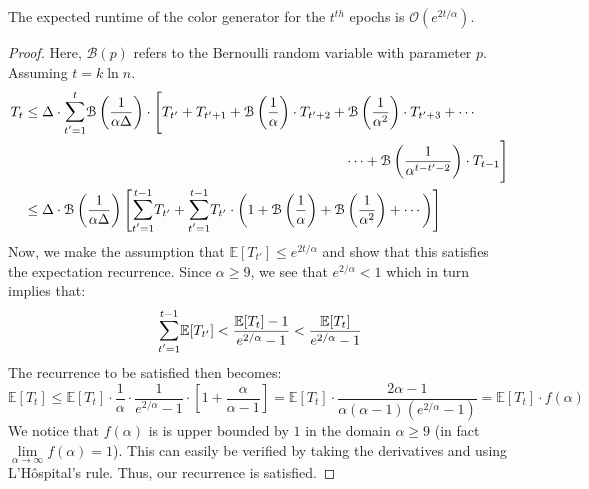 \begin{theorem}
\label{thm:coloring_recurrence}
The expected runtime of the color generator for the $t^{th}$ epochs is $\mathcal O\left( e^{2t/\alpha}\right)$.
\end{theorem}
\begin{proof}
Here, $\mathcal B(p)$ refers to the Bernoulli random variable with parameter $p$.
Assuming $t = k\ln n$.
\begin{align}
T_{t} &\le \Delta \cdot \mathlarger\sum\limits_{t'=1}^{t} \mathcal B\left( \frac{1}{\alpha\Delta}\right)\cdot
\Biggl[ T_{t'} + T_{t'+1} + \mathcal B\left(\frac{1}{\alpha}\right)\cdot T_{t'+2}
+ \mathcal B\left(\frac{1}{\alpha^2}\right)\cdot T_{t'+3} + \cdots\\
&\hspace{23em}
\cdots + \mathcal B\left(\frac{1}{\alpha^{t-t'-2}}\right)\cdot T_{t-1} \Biggr]\\
&\le \Delta\cdot\mathcal B\left( \frac{1}{\alpha\Delta}\right) \Biggl[
\mathlarger\sum\limits_{t'=1}^{t-1} T_{t'} +
\mathlarger\sum\limits_{t'=1}^{t-1} T_{t'}\cdot \left(1 + \mathcal B\left(\frac1\alpha\right) + \mathcal B\left(\frac1{\alpha^2}\right) + \cdots\right)
\Biggr]
\end{align}
Now, we make the assumption that $\mathbb E[T_{t'}]\le e^{2t/\alpha}$ and show that this satisfies the expectation recurrence.
Since $\alpha\ge 9$, we see that $e^{2/\alpha}<1$ which in turn implies that:
\[
\mathlarger\sum\limits_{t'=1}^{t-1} \mathbb E[T_{t'}] < \frac{\mathbb E[T_t]-1}{e^{2/\alpha}-1} < \frac{\mathbb E[T_t]}{e^{2/\alpha}-1}
\]
The recurrence to be satisfied then becomes:
\[
\mathbb E[T_t]\le \mathbb E[T_t]\cdot \frac 1{\alpha}\cdot \frac{1}{e^{2/\alpha}-1}\cdot \left[ 1+ \frac{\alpha}{\alpha-1} \right]
= \mathbb E[T_t]\cdot \frac{2\alpha-1}{\alpha(\alpha-1)(e^{2/\alpha}-1)} = \mathbb E[T_t]\cdot f(\alpha)
\]
We notice that $f(\alpha)$ is is upper bounded by $1$ in the domain $\alpha\ge 9$ (in fact $\lim\limits_{\alpha\to\infty}f(\alpha) = 1$).
This can easily be verified by taking the derivatives and using L'H\^{o}spital's rule.
Thus, our recurrence is satisfied.
\end{proof}
